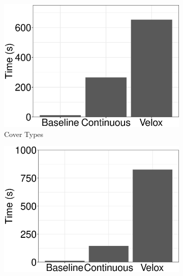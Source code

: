 \documentclass[10pt,conference,letterpaper]{IEEEtran}
\begin{document}
\begin{figure}[h]
\begin{subfigure}[b]{0.2\textwidth}
	\includegraphics[width=\linewidth, height=\linewidth,keepaspectratio]{../images/experiment-results/cover-types-times.eps}
	\caption{Cover Types}
	\label{fig:cover-types-times}
\end{subfigure}%
\begin{subfigure}[b]{0.2\textwidth}
	\includegraphics[width=\linewidth, height=\linewidth,keepaspectratio]{../images/experiment-results/sea-times.eps}

\end{subfigure}
\end{figure}
\end{document}
